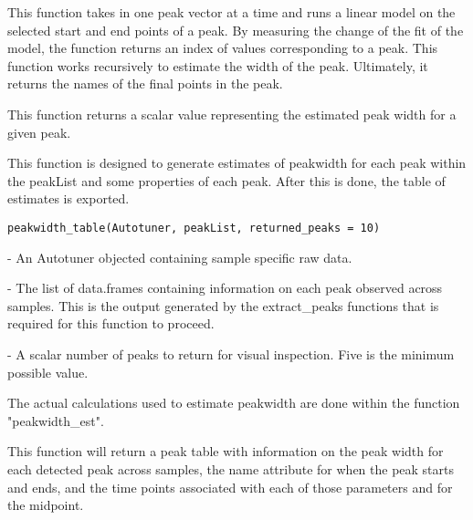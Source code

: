 \documentclass[a4paper]{book}
\begin{document}
%
\begin{Details}\relax
This function takes in one peak vector at a time and runs a linear
model on the selected start and end points of a peak. By measuring the
change of the fit of the model, the function returns an index of values
corresponding to a peak. This function works recursively to estimate
the width of the peak. Ultimately, it returns the names of the final
points in the peak.
\end{Details}
%
\begin{Value}
This function returns a scalar value representing the estimated peak
width for a given peak.
\end{Value}
%
\begin{Description}\relax
This function is designed to generate estimates of peakwidth
for each peak within the peakList and some properties of each peak. After
this is done, the table of estimates is exported.
\end{Description}
%
\begin{Usage}
\begin{verbatim}
peakwidth_table(Autotuner, peakList, returned_peaks = 10)
\end{verbatim}
\end{Usage}
%
\begin{Arguments}
\begin{ldescription}
\item[\code{Autotuner}] - An Autotuner objected containing sample specific raw
data.

\item[\code{peakList}] - The list of data.frames containing information on each
peak observed across samples. This is the output generated by the
extract\_peaks functions that is required for this function to proceed.

\item[\code{returned\_peaks}] - A scalar number of peaks to return for visual
inspection. Five is the minimum possible value.
\end{ldescription}
\end{Arguments}
%
\begin{Details}\relax
The actual calculations used to estimate peakwidth are done within
the function "peakwidth\_est".
\end{Details}
%
\begin{Value}
This function will return a peak table with information on
the peak width for each detected peak across samples, the name
attribute for when the peak starts and ends, and the time points
associated with each of those parameters and for the midpoint.
\end{Value}
\end{document}
